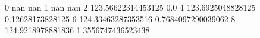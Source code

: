 0 nan nan
1 nan nan
2 123.56622314453125 0.0
4 123.6925048828125 0.12628173828125
6 124.33463287353516 0.7684097290039062
8 124.9218978881836 1.3556747436523438
